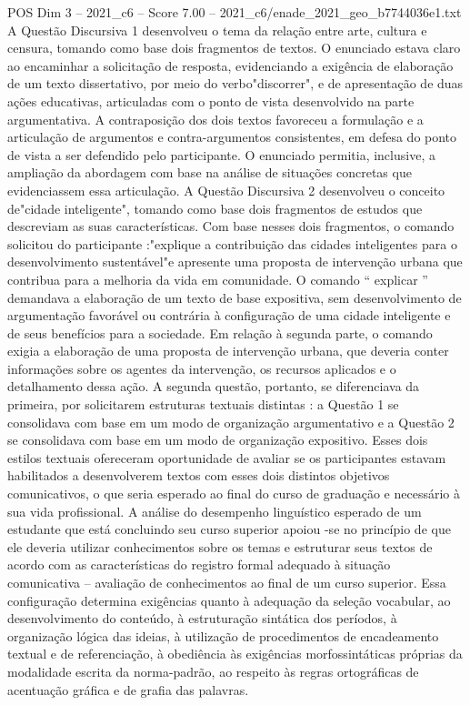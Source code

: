 \begin{textsample}{POS Dim 3 – 2021\_c6 – Score 7.00 – 2021\_c6/enade\_2021\_geo\_b7744036e1.txt}
A Questão Discursiva 1 desenvolveu o tema da relação entre arte, cultura e censura, tomando como base dois fragmentos de textos.
O enunciado estava claro ao encaminhar a solicitação de resposta, evidenciando a exigência de elaboração de um texto dissertativo, por meio do verbo"discorrer", e de apresentação de duas ações educativas, articuladas com o ponto de vista desenvolvido na parte argumentativa.
A contraposição dos dois textos favoreceu a formulação e a articulação de argumentos e contra-argumentos consistentes, em defesa do ponto de vista a ser defendido pelo participante.
O enunciado permitia, inclusive, a ampliação da abordagem com base na análise de situações concretas que evidenciassem essa articulação.
A Questão Discursiva 2 desenvolveu o conceito de"cidade inteligente", tomando como base dois fragmentos de estudos que descreviam as suas características.
Com base nesses dois fragmentos, o comando solicitou do participante :"explique a contribuição das cidades inteligentes para o desenvolvimento sustentável"e apresente uma proposta de intervenção urbana que contribua para a melhoria da vida em comunidade.
O comando “ explicar ” demandava a elaboração de um texto de base expositiva, sem desenvolvimento de argumentação favorável ou contrária à configuração de uma cidade inteligente e de seus benefícios para a sociedade.
Em relação à segunda parte, o comando exigia a elaboração de uma proposta de intervenção urbana, que deveria conter informações sobre os agentes da intervenção, os recursos aplicados e o detalhamento dessa ação.
A segunda questão, portanto, se diferenciava da primeira, por solicitarem estruturas textuais distintas : a Questão 1 se consolidava com base em um modo de organização argumentativo e a Questão 2 se consolidava com base em um modo de organização expositivo.
Esses dois estilos textuais ofereceram oportunidade de avaliar se os participantes estavam habilitados a desenvolverem textos com esses dois distintos objetivos comunicativos, o que seria esperado ao final do curso de graduação e necessário à sua vida profissional.
A análise do desempenho linguístico esperado de um estudante que está concluindo seu curso superior apoiou -se no princípio de que ele deveria utilizar conhecimentos sobre os temas e estruturar seus textos de acordo com as características do registro formal adequado à situação comunicativa – avaliação de conhecimentos ao final de um curso superior.
Essa configuração determina exigências quanto à adequação da seleção vocabular, ao desenvolvimento do conteúdo, à estruturação sintática dos períodos, à organização lógica das ideias, à utilização de procedimentos de encadeamento textual e de referenciação, à obediência às exigências morfossintáticas próprias da modalidade escrita da norma-padrão, ao respeito às regras ortográficas de acentuação gráfica e de grafia das palavras.

\end{textsample}
